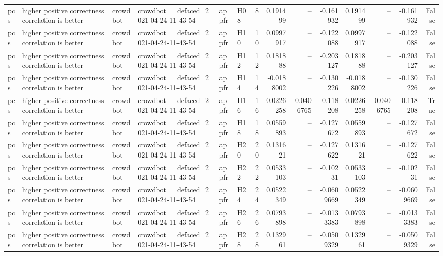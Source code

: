\begin{longtable}{llllllrrrrrrrr}
pcs & higher positive correctness correlation is better & crowdbot & crowdbot\_\_defaced\_2021-04-24-11-43-54 & appfr & H08 & 8 & 0.191499 & -- & -0.161932 & 0.191499 & -- & -0.161932 & False \\
pcs & higher positive correctness correlation is better & crowdbot & crowdbot\_\_defaced\_2021-04-24-11-43-54 & appfr & H10 & 10 & 0.0997917 & -- & -0.122088 & 0.0997917 & -- & -0.122088 & False \\
pcs & higher positive correctness correlation is better & crowdbot & crowdbot\_\_defaced\_2021-04-24-11-43-54 & appfr & H12 & 12 & 0.181888 & -- & -0.203127 & 0.181888 & -- & -0.203127 & False \\
pcs & higher positive correctness correlation is better & crowdbot & crowdbot\_\_defaced\_2021-04-24-11-43-54 & appfr & H14 & 14 & -0.0188002 & -- & -0.130226 & -0.0188002 & -- & -0.130226 & False \\
pcs & higher positive correctness correlation is better & crowdbot & crowdbot\_\_defaced\_2021-04-24-11-43-54 & appfr & H16 & 16 & 0.0226258 & 0.0406765 & -0.118208 & 0.0226258 & 0.0406765 & -0.118208 & True \\
pcs & higher positive correctness correlation is better & crowdbot & crowdbot\_\_defaced\_2021-04-24-11-43-54 & appfr & H18 & 18 & 0.0559893 & -- & -0.127672 & 0.0559893 & -- & -0.127672 & False \\
pcs & higher positive correctness correlation is better & crowdbot & crowdbot\_\_defaced\_2021-04-24-11-43-54 & appfr & H20 & 20 & 0.131621 & -- & -0.127622 & 0.131621 & -- & -0.127622 & False \\
pcs & higher positive correctness correlation is better & crowdbot & crowdbot\_\_defaced\_2021-04-24-11-43-54 & appfr & H22 & 22 & 0.0533103 & -- & -0.10231 & 0.0533103 & -- & -0.10231 & False \\
pcs & higher positive correctness correlation is better & crowdbot & crowdbot\_\_defaced\_2021-04-24-11-43-54 & appfr & H24 & 24 & 0.0522349 & -- & -0.0609669 & 0.0522349 & -- & -0.0609669 & False \\
pcs & higher positive correctness correlation is better & crowdbot & crowdbot\_\_defaced\_2021-04-24-11-43-54 & appfr & H26 & 26 & 0.0793898 & -- & -0.0133383 & 0.0793898 & -- & -0.0133383 & False \\
pcs & higher positive correctness correlation is better & crowdbot & crowdbot\_\_defaced\_2021-04-24-11-43-54 & appfr & H28 & 28 & 0.132961 & -- & -0.0509329 & 0.132961 & -- & -0.0509329 & False \\

\end{longtable}
